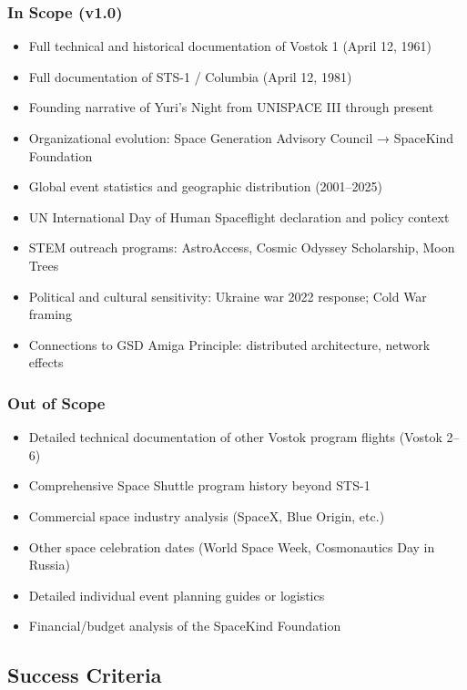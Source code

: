 \documentclass[11pt,letterpaper]{article}
\begin{document}
\subsubsection{In Scope (v1.0)}
\begin{itemize}[leftmargin=*]
  \item Full technical and historical documentation of Vostok 1 (April 12, 1961)
  \item Full documentation of STS-1 / Columbia (April 12, 1981)
  \item Founding narrative of Yuri's Night from UNISPACE III through present
  \item Organizational evolution: Space Generation Advisory Council → SpaceKind Foundation
  \item Global event statistics and geographic distribution (2001--2025)
  \item UN International Day of Human Spaceflight declaration and policy context
  \item STEM outreach programs: AstroAccess, Cosmic Odyssey Scholarship, Moon Trees
  \item Political and cultural sensitivity: Ukraine war 2022 response; Cold War framing
  \item Connections to GSD Amiga Principle: distributed architecture, network effects
\end{itemize}

\subsubsection{Out of Scope}
\begin{itemize}[leftmargin=*]
  \item Detailed technical documentation of other Vostok program flights (Vostok 2--6)
  \item Comprehensive Space Shuttle program history beyond STS-1
  \item Commercial space industry analysis (SpaceX, Blue Origin, etc.)
  \item Other space celebration dates (World Space Week, Cosmonautics Day in Russia)
  \item Detailed individual event planning guides or logistics
  \item Financial/budget analysis of the SpaceKind Foundation
\end{itemize}

\subsection{Success Criteria}
\end{document}
